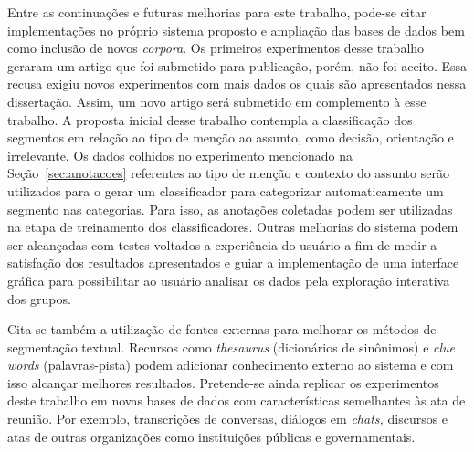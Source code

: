 Entre as continuações e futuras melhorias para este trabalho, pode-se citar implementações no próprio sistema proposto e ampliação das bases de dados bem como inclusão de novos \textit{corpora}.  
%
Os primeiros experimentos desse trabalho geraram um artigo que foi submetido para publicação, porém, não foi aceito. Essa recusa exigiu novos experimentos com mais dados os quais são apresentados nessa dissertação. Assim, um novo artigo será submetido em complemento à esse trabalho.
% 
A proposta inicial desse trabalho contempla a classificação dos segmentos em relação ao tipo de menção ao assunto, como decisão, orientação e irrelevante. Os dados colhidos no experimento mencionado na Seção~\ref{sec:anotacoes} referentes ao tipo de menção e contexto do assunto serão utilizados para o gerar um classificador para categorizar automaticamente um segmento nas categorias. Para isso, as anotações coletadas podem ser utilizadas na etapa de treinamento dos classificadores.
%
Outras melhorias do sistema podem ser alcançadas com testes voltados a experiência do usuário a fim de medir a satisfação dos resultados apresentados e guiar a implementação de uma interface gráfica para possibilitar ao usuário analisar os dados pela exploração interativa dos grupos.
%

Cita-se também a utilização de fontes externas para melhorar os métodos de segmentação textual. Recursos como \textit{thesaurus} (dicionários de sinônimos) e \textit{clue words} (palavras-pista) podem adicionar conhecimento externo ao sistema e com isso alcançar melhores resultados. 
%
Pretende-se ainda replicar os experimentos deste trabalho em novas bases de dados com características semelhantes às ata de reunião. Por exemplo, transcrições de conversas, diálogos em \textit{chats,} discursos e atas de outras organizações como instituições públicas e governamentais.  

















